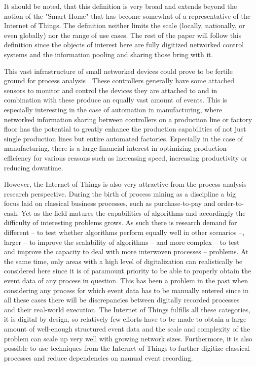 \documentclass[runningheads]{template/llncs}
\begin{document}
It should be noted, that this definition is very broad and extends beyond the notion of the "Smart Home" that has become somewhat of a representative of the Internet of Things.
The definition neither limits the scale (locally, nationally, or even globally) nor the range of use cases.
The rest of the paper will follow this definition since the objects of interest here are fully digitized networked control systems and the information pooling and sharing those bring with it.

This vast infrastructure of small networked devices could prove to be fertile ground for process analysis \cite{JKM*20}.
These controllers generally have some attached sensors to monitor and control the devices they are attached to and in combination with these produce an equally vast amount of events.
This is especially interesting in the case of automation in manufacturing, where networked information sharing between controllers on a production line or factory floor has the potential to greatly enhance the production capabilities of not just single production lines but entire automated factories.
Especially in the case of manufacturing, there is a large financial interest in optimizing production efficiency for various reasons such as increasing speed, increasing productivity or reducing downtime.

However, the Internet of Things is also very attractive from the process analysis research perspective.
During the birth of process mining as a discipline a big focus laid on classical business processes, such as purchase-to-pay and order-to-cash.
Yet as the field matures the capabilities of algorithms and accordingly the difficulty of interesting problems grows.
As such there is research demand \cite{JKM*20} for different -- to test whether algorithms perform equally well in other scenarios --, larger -- to improve the scalability of algorithms -- and more complex -- to test and improve the capacity to deal with more interwoven processes -- problems.
At the same time, only areas with a high level of digitalization can realistically be considered here since it is of paramount priority to be able to properly obtain the event data of any process in question.
This has been a problem in the past when considering any process for which event data has to be manually entered since in all these cases there will be discrepancies between digitally recorded processes and their real-world execution.
The Internet of Things fulfills all these categories, it is digital by design, so relatively few efforts have to be made to obtain a large amount of well-enough structured event data and the scale and complexity of the problem can scale up very well with growing network sizes. 
Furthermore, it is also possible to use techniques from the Internet of Things to further digitize classical processes and reduce dependencies on manual event recording.
\end{document}

